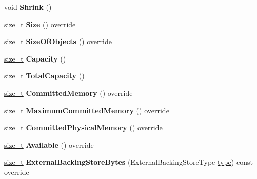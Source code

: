 \begin{DoxyCompactItemize}
void {\bfseries Shrink} ()
\item 
\mbox{\label{classv8_1_1internal_1_1NewSpace_a23a325bc3ff38eeaef075ba5f4609894}} 
\mbox{\hyperlink{classsize__t}{size\+\_\+t}} {\bfseries Size} () override
\item 
\mbox{\label{classv8_1_1internal_1_1NewSpace_a81c544c7f087e8f7dbf61360f5b1703c}} 
\mbox{\hyperlink{classsize__t}{size\+\_\+t}} {\bfseries Size\+Of\+Objects} () override
\item 
\mbox{\label{classv8_1_1internal_1_1NewSpace_aca6b1912e31a2dc52449a0a6bbc56b83}} 
\mbox{\hyperlink{classsize__t}{size\+\_\+t}} {\bfseries Capacity} ()
\item 
\mbox{\label{classv8_1_1internal_1_1NewSpace_aa76be58188189e34af3547582f56dc81}} 
\mbox{\hyperlink{classsize__t}{size\+\_\+t}} {\bfseries Total\+Capacity} ()
\item 
\mbox{\label{classv8_1_1internal_1_1NewSpace_a1708a4cdf946027607c3c6a5ea1d0027}} 
\mbox{\hyperlink{classsize__t}{size\+\_\+t}} {\bfseries Committed\+Memory} () override
\item 
\mbox{\label{classv8_1_1internal_1_1NewSpace_ab2a85e0418c31e54bf617bd2a5f7c99f}} 
\mbox{\hyperlink{classsize__t}{size\+\_\+t}} {\bfseries Maximum\+Committed\+Memory} () override
\item 
\mbox{\label{classv8_1_1internal_1_1NewSpace_a384eb2dd170ca3a4d36b01ffd6da2518}} 
\mbox{\hyperlink{classsize__t}{size\+\_\+t}} {\bfseries Committed\+Physical\+Memory} () override
\item 
\mbox{\label{classv8_1_1internal_1_1NewSpace_ac43f679e0011abba54b8d5720c3c3183}} 
\mbox{\hyperlink{classsize__t}{size\+\_\+t}} {\bfseries Available} () override
\item 
\mbox{\label{classv8_1_1internal_1_1NewSpace_a72f84efe7b9182ad10ef373784662613}} 
\mbox{\hyperlink{classsize__t}{size\+\_\+t}} {\bfseries External\+Backing\+Store\+Bytes} (External\+Backing\+Store\+Type \mbox{\hyperlink{classstd_1_1conditional_1_1type}{type}}) const override

\end{DoxyCompactItemize}
